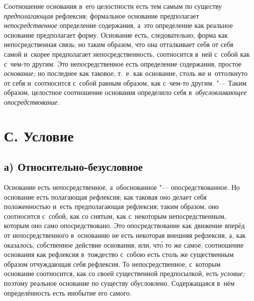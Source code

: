 Соотношение основания в~его целостности есть тем самым по существу
{\em предполагающая} рефлексия; формальное основание
предполагает {\em непосредственное} определение
содержания, а~это определение как реальное основание предполагает форму.
Основание есть, следовательно, форма как непосредственная связь; но таким
образом, что она отталкивает себя от себя самой и~скорее предполагает
непосредственность, соотносится в~ней с~собой как с~чем-то другим. Это
непосредственное есть определение содержания, простое
{\em основание;} но последнее как таковое, т.~е. как
основание, столь же и~оттолкнуто от себя и~соотносится с~собой равным
образом, как с~чем-то другим. "--- Таким образом, целостное соотношение
основания определило себя в~{\em обусловливающее опосредствование.}

\section[С. Условие]{С. Условие}

\subsection[а) Относительно-безусловное]{а) Относительно-безусловное}

Основание есть непосредственное, а~обоснованное
"--- опосредствованное. Но основание есть полагающая рефлексия; как таковая
оно делает себя положенностью и~есть предполагающая рефлексия; таким
образом, оно соотносится с~собой, как со снятым, как с~некоторым
непосредственным, которым оно само опосредствовано. Это опосредствование
как движение вперёд от непосредственного в~основанию не есть некоторая
внешняя рефлексия, а, как оказалось, собственное действие основания, или,
чт\'{о} то же самое, соотношение основания как рефлексия в~тождество с~собою
есть столь же существенным образом отчуждающая себя рефлексия. То
непосредственное, с~которым основание соотносится, как со своей
существенной предпосылкой, есть {\em условие;} поэтому
реальное основание по существу обусловлено. Содержащаяся в~нём
определённость есть инобытие его самого.

